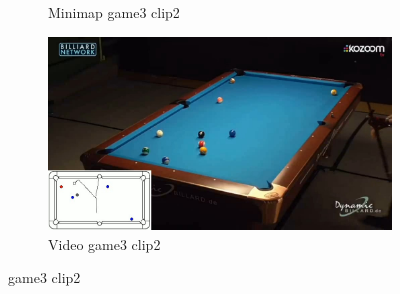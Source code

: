 \begin{figure}[H]
\begin{subfigure}[b]{0.48\textwidth}
    	\caption{Minimap game3 clip2}
    	\label{fig: game3_clip2_minimap}
    \end{subfigure}
    \begin{subfigure}[b]{0.48\textwidth}
    	\centering
    	\includegraphics[width=\textwidth]{images/Video/game3_clip2_video.jpg}
    	\caption{Video game3 clip2}
    	\label{fig: game3_clip2_video}
    \end{subfigure}
    
	\caption{game3 clip2}
\end{figure}

